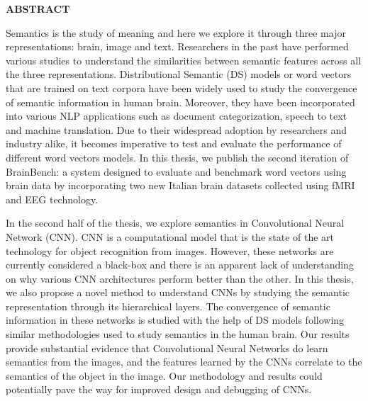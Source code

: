 \newpage
{}
\begin{center}
\textbf{ABSTRACT}
\end{center}

Semantics is the study of meaning and here we explore it through three major representations: brain, image and text. Researchers in the past have performed various studies to understand
the similarities between semantic features across all the three representations.
Distributional Semantic (DS) models  or word vectors that are trained on text corpora
have been widely used to study the convergence of semantic information in human brain. Moreover, they have been incorporated into various NLP applications
such as document categorization, speech to text and machine translation. Due to
their widespread adoption by researchers and industry alike, it becomes imperative
to test and evaluate the performance of different word vectors models. In this thesis, we publish the second iteration of BrainBench: a system designed to evaluate and benchmark word vectors using brain data by incorporating two new Italian brain datasets collected using fMRI and EEG
technology. 

In the second half of the thesis, we explore semantics in Convolutional Neural Network (CNN). CNN is a computational model
that is the state of the art technology for object recognition from images.
However, these networks are currently considered a black-box and there is an apparent lack of understanding on why various CNN architectures
perform better than the other. In this thesis, we also propose a novel method
to understand CNNs by studying the semantic representation through its hierarchical layers. The convergence of semantic information in these networks is studied with
the help of DS models following similar methodologies used to study semantics in the human brain. Our results provide substantial evidence that Convolutional Neural Networks do learn semantics from the images, and the features learned by the CNNs correlate to the semantics
of the object in the image. Our methodology and results could potentially pave the way for improved design and debugging of CNNs.